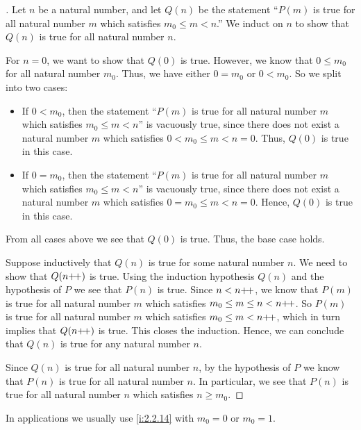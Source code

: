 \begin{proof}[]
  Let \(n\) be a natural number, and let \(Q(n)\) be the statement ``\(P(m)\) is true for all natural number \(m\) which satisfies \(m_0 \leq m < n\).''
  We induct on \(n\) to show that \(Q(n)\) is true for all natural number \(n\).

  For \(n = 0\), we want to show that \(Q(0)\) is true.
  However, we know that \(0 \leq m_0\) for all natural number \(m_0\).
  Thus, we have either \(0 = m_0\) or \(0 < m_0\).
  So we split into two cases:
  \begin{itemize}
    \item If \(0 < m_0\), then the statement ``\(P(m)\) is true for all natural number \(m\) which satisfies \(m_0 \leq m < n\)'' is vacuously true, since there does not exist a natural number \(m\) which satisfies \(0 < m_0 \leq m < n = 0\).
          Thus, \(Q(0)\) is true in this case.
    \item If \(0 = m_0\), then the statement ``\(P(m)\) is true for all natural number \(m\) which satisfies \(m_0 \leq m < n\)'' is vacuously true, since there does not exist a natural number \(m\) which satisfies \(0 = m_0 \leq m < n = 0\).
          Hence, \(Q(0)\) is true in this case.
  \end{itemize}
  From all cases above we see that \(Q(0)\) is true.
  Thus, the base case holds.

  Suppose inductively that \(Q(n)\) is true for some natural number \(n\).
  We need to show that \(Q(n{+}\!{+})\) is true.
  Using the induction hypothesis \(Q(n)\) and the hypothesis of \(P\) we see that \(P(n)\) is true.
  Since \(n < n{+}\!{+}\), we know that \(P(m)\) is true for all natural number \(m\) which satisfies \(m_0 \leq m \leq n < n{+}\!{+}\).
  So \(P(m)\) is true for all natural number \(m\) which satisfies \(m_0 \leq m < n{+}\!{+}\), which in turn implies that \(Q(n{+}\!{+})\) is true.
  This closes the induction.
  Hence, we can conclude that \(Q(n)\) is true for any natural number \(n\).

  Since \(Q(n)\) is true for all natural number \(n\), by the hypothesis of \(P\) we know that \(P(n)\) is true for all natural number \(n\).
  In particular, we see that \(P(n)\) is true for all natural number \(n\) which satisfies \(n \geq m_0\).
\end{proof}

\begin{rmk}\label{i:2.2.15}
  In applications we usually use \cref{i:2.2.14} with \(m_0 = 0\) or \(m_0 = 1\).
\end{rmk}

